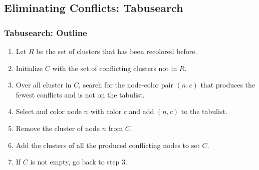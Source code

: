 \documentclass{beamer}
\begin{document}

\subsection{Eliminating Conflicts: Tabusearch}
\begin{frame}[fragile]
\frametitle{Tabusearch: Outline}
\begin{enumerate}
\item Let $R$ be the set of clusters that has been recolored before.
\item Initialize $C$ with the set of conflicting clusters not in $R$.
\item Over all cluster in $C$, search for the node-color pair $(n,c)$ that produces the fewest conflicts and is not on the tabulist.
\item Select and color node $n$ with color $c$ and add $(n,c)$ to the tabulist.
\item Remove the cluster of node $n$ from $C$.
\item Add the clusters of all the produced conflicting nodes to set $C$.
\item If $C$ is not empty, go back to step 3.
\end{enumerate}
\end{frame}
\end{document}
